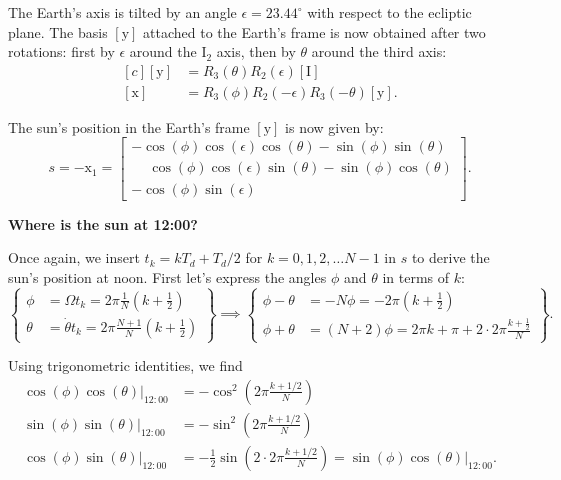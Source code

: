 \documentclass[12pt]{article}
\begin{document}
The Earth's axis is tilted by an angle $\epsilon=23.44^\circ$ with respect to
the ecliptic plane. The basis $[\mathrm{y}]$ attached to the Earth's frame is 
now obtained after two rotations: first by $\epsilon$ around the $\mathrm{I}_2$ 
axis, then by $\theta$ around the third axis:
\begin{equation}
    \begin{aligned}[c]
        [ \mathrm{y} ] &= R_3(\theta) R_2(\epsilon) [\mathrm{I}] \\
        [ \mathrm{x} ] &= R_3(\phi) R_2(-\epsilon) R_3(-\theta)[\mathrm{y}].
    \end{aligned}
\end{equation}

The sun's position in the Earth's frame $[\mathrm{y}]$ is now given by:
\begin{equation}
    s = -\mathrm{x}_1 =
    \begin{bmatrix}
        -\cos(\phi)\cos(\epsilon)\cos(\theta) - \sin(\phi)\sin(\theta)\\
        \phantom{+}\cos(\phi)\cos(\epsilon)\sin(\theta)-\sin(\phi) \cos(\theta)\\
        -\cos(\phi)\sin(\epsilon)\phantom{\sin(\theta)+\sin(\phi) \cos(\theta)}
    \end{bmatrix}.
    \label{eq:position}
\end{equation}

\textbf{Where is the sun at 12:00?}

Once again, we insert $t_{k}=kT_d+T_d/2$ for $k=0,1,2,\ldots N-1$ in $s$ to 
derive the sun's position at noon. First let's express the angles $\phi$ and 
$\theta$ in terms of $k$:
\begin{equation}
    \left\{
    \begin{aligned}
        \phi &= \Omega t_{k} = 2\pi \frac{1}{N} (k+\tfrac{1}{2})\\
        \theta &= \dot\theta t_{k} = 2\pi \frac{N+1}{N} (k+\tfrac{1}{2})
    \end{aligned}
    \right\} \implies
    \left\{
    \begin{aligned}
        \phi-\theta &= -N\phi = -2\pi (k+\tfrac{1}{2})\\
        \phi+\theta &= (N+2)\phi = 2\pi k + \pi + 2\cdot 2\pi \frac{k+\tfrac{1}{2}}{N}
    \end{aligned}
    \right\}.
\end{equation}

Using trigonometric identities, we find
\begin{equation}
    \begin{aligned}
        \cos(\phi)\cos(\theta)\vert_{12:00} &= -\cos^2\left(2\pi \frac{k+1/2}{N}\right)\\
        \sin(\phi)\sin(\theta)\vert_{12:00} &= -\sin^2\left(2\pi \frac{k+1/2}{N}\right)\\
        \cos(\phi)\sin(\theta)\vert_{12:00} &= -\frac{1}{2} \sin(2\cdot 2\pi \frac{k+1/2}{N})
        = \sin(\phi)\cos(\theta)\vert_{12:00}.
    \end{aligned}
\end{equation}
\end{document}
